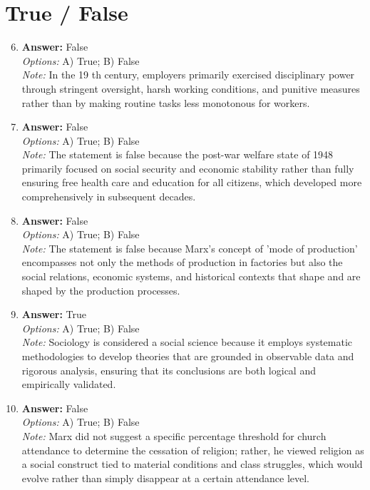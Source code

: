 \documentclass[12pt]{article}
\begin{document}
\section*{True / False}
\begin{enumerate}[label=\arabic*.]
\setcounter{enumi}{5}
\item \textbf{Answer:} False
\\ \textit{Options:} A) True; B) False
\\ \textit{Note:} In the 19 th century, employers primarily exercised disciplinary power through stringent oversight, harsh working conditions, and punitive measures rather than by making routine tasks less monotonous for workers.
\item \textbf{Answer:} False
\\ \textit{Options:} A) True; B) False
\\ \textit{Note:} The statement is false because the post-war welfare state of 1948 primarily focused on social security and economic stability rather than fully ensuring free health care and education for all citizens, which developed more comprehensively in subsequent decades.
\item \textbf{Answer:} False
\\ \textit{Options:} A) True; B) False
\\ \textit{Note:} The statement is false because Marx's concept of 'mode of production' encompasses not only the methods of production in factories but also the social relations, economic systems, and historical contexts that shape and are shaped by the production processes.
\item \textbf{Answer:} True
\\ \textit{Options:} A) True; B) False
\\ \textit{Note:} Sociology is considered a social science because it employs systematic methodologies to develop theories that are grounded in observable data and rigorous analysis, ensuring that its conclusions are both logical and empirically validated.
\item \textbf{Answer:} False
\\ \textit{Options:} A) True; B) False
\\ \textit{Note:} Marx did not suggest a specific percentage threshold for church attendance to determine the cessation of religion; rather, he viewed religion as a social construct tied to material conditions and class struggles, which would evolve rather than simply disappear at a certain attendance level.
\end{enumerate}
\end{document}
